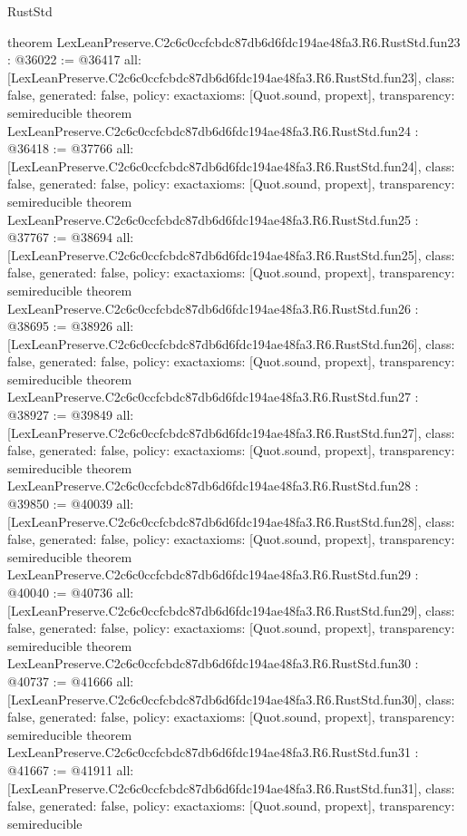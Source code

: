 \begin{lexlean}{RustStd}
\begin{coremodule}
{}
theorem LexLeanPreserve.C2c6c0ccfcbdc87db6d6fdc194ae48fa3.R6.RustStd.fun23 : @36022 := @36417 {
  all: [LexLeanPreserve.C2c6c0ccfcbdc87db6d6fdc194ae48fa3.R6.RustStd.fun23],
  class: false,
  generated: false,
  policy: exact{axioms: [Quot.sound, propext]},
  transparency: semireducible
}
theorem LexLeanPreserve.C2c6c0ccfcbdc87db6d6fdc194ae48fa3.R6.RustStd.fun24 : @36418 := @37766 {
  all: [LexLeanPreserve.C2c6c0ccfcbdc87db6d6fdc194ae48fa3.R6.RustStd.fun24],
  class: false,
  generated: false,
  policy: exact{axioms: [Quot.sound, propext]},
  transparency: semireducible
}
theorem LexLeanPreserve.C2c6c0ccfcbdc87db6d6fdc194ae48fa3.R6.RustStd.fun25 : @37767 := @38694 {
  all: [LexLeanPreserve.C2c6c0ccfcbdc87db6d6fdc194ae48fa3.R6.RustStd.fun25],
  class: false,
  generated: false,
  policy: exact{axioms: [Quot.sound, propext]},
  transparency: semireducible
}
theorem LexLeanPreserve.C2c6c0ccfcbdc87db6d6fdc194ae48fa3.R6.RustStd.fun26 : @38695 := @38926 {
  all: [LexLeanPreserve.C2c6c0ccfcbdc87db6d6fdc194ae48fa3.R6.RustStd.fun26],
  class: false,
  generated: false,
  policy: exact{axioms: [Quot.sound, propext]},
  transparency: semireducible
}
theorem LexLeanPreserve.C2c6c0ccfcbdc87db6d6fdc194ae48fa3.R6.RustStd.fun27 : @38927 := @39849 {
  all: [LexLeanPreserve.C2c6c0ccfcbdc87db6d6fdc194ae48fa3.R6.RustStd.fun27],
  class: false,
  generated: false,
  policy: exact{axioms: [Quot.sound, propext]},
  transparency: semireducible
}
theorem LexLeanPreserve.C2c6c0ccfcbdc87db6d6fdc194ae48fa3.R6.RustStd.fun28 : @39850 := @40039 {
  all: [LexLeanPreserve.C2c6c0ccfcbdc87db6d6fdc194ae48fa3.R6.RustStd.fun28],
  class: false,
  generated: false,
  policy: exact{axioms: [Quot.sound, propext]},
  transparency: semireducible
}
theorem LexLeanPreserve.C2c6c0ccfcbdc87db6d6fdc194ae48fa3.R6.RustStd.fun29 : @40040 := @40736 {
  all: [LexLeanPreserve.C2c6c0ccfcbdc87db6d6fdc194ae48fa3.R6.RustStd.fun29],
  class: false,
  generated: false,
  policy: exact{axioms: [Quot.sound, propext]},
  transparency: semireducible
}
theorem LexLeanPreserve.C2c6c0ccfcbdc87db6d6fdc194ae48fa3.R6.RustStd.fun30 : @40737 := @41666 {
  all: [LexLeanPreserve.C2c6c0ccfcbdc87db6d6fdc194ae48fa3.R6.RustStd.fun30],
  class: false,
  generated: false,
  policy: exact{axioms: [Quot.sound, propext]},
  transparency: semireducible
}
theorem LexLeanPreserve.C2c6c0ccfcbdc87db6d6fdc194ae48fa3.R6.RustStd.fun31 : @41667 := @41911 {
  all: [LexLeanPreserve.C2c6c0ccfcbdc87db6d6fdc194ae48fa3.R6.RustStd.fun31],
  class: false,
  generated: false,
  policy: exact{axioms: [Quot.sound, propext]},
  transparency: semireducible
}
\end{coremodule}
\end{lexlean}
